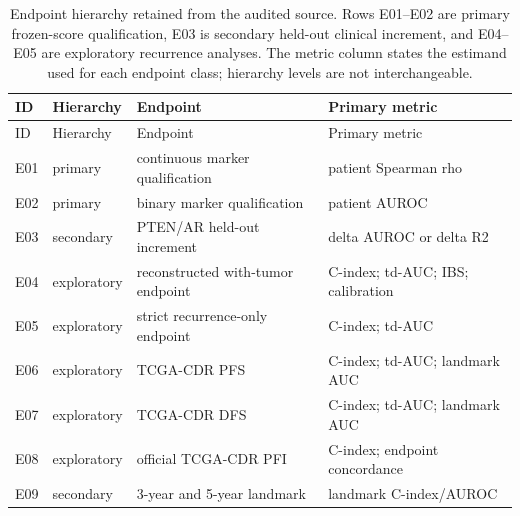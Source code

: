 \begingroup
\small
\begin{longtable}{@{}p{}p{}p{}p{}@{}}
\caption{Endpoint hierarchy retained from the audited source. Rows E01--E02 are primary frozen-score qualification, E03 is secondary held-out clinical increment, and E04--E05 are exploratory recurrence analyses. The metric column states the estimand used for each endpoint class; hierarchy levels are not interchangeable.}
\label{tab:supp-endpoint-hierarchy}\\
\toprule
ID & Hierarchy & Endpoint & Primary metric \\
\midrule
\endfirsthead
\toprule
ID & Hierarchy & Endpoint & Primary metric \\
\midrule
\endhead
E01 & primary & continuous marker qualification & patient Spearman rho \\
E02 & primary & binary marker qualification & patient AUROC \\
E03 & secondary & PTEN/AR held-out increment & delta AUROC or delta R2 \\
E04 & exploratory & reconstructed with-tumor endpoint & C-index; td-AUC; IBS; calibration \\
E05 & exploratory & strict recurrence-only endpoint & C-index; td-AUC \\
E06 & exploratory & TCGA-CDR PFS & C-index; td-AUC; landmark AUC \\
E07 & exploratory & TCGA-CDR DFS & C-index; td-AUC; landmark AUC \\
E08 & exploratory & official TCGA-CDR PFI & C-index; endpoint concordance \\
E09 & secondary & 3-year and 5-year landmark & landmark C-index/AUROC \\
\bottomrule
\end{longtable}
\endgroup
